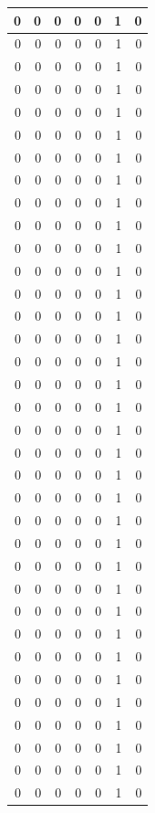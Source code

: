 \documentclass[
  12pt,
]{krantz}
\begin{document}
\begin{tabular}{r|r|r|r|r|r|r}
\hline
0 & 0 & 0 & 0 & 0 & 1 & 0\\
\hline
0 & 0 & 0 & 0 & 0 & 1 & 0\\
\hline
0 & 0 & 0 & 0 & 0 & 1 & 0\\
\hline
0 & 0 & 0 & 0 & 0 & 1 & 0\\
\hline
0 & 0 & 0 & 0 & 0 & 1 & 0\\
\hline
0 & 0 & 0 & 0 & 0 & 1 & 0\\
\hline
0 & 0 & 0 & 0 & 0 & 1 & 0\\
\hline
0 & 0 & 0 & 0 & 0 & 1 & 0\\
\hline
0 & 0 & 0 & 0 & 0 & 1 & 0\\
\hline
0 & 0 & 0 & 0 & 0 & 1 & 0\\
\hline
0 & 0 & 0 & 0 & 0 & 1 & 0\\
\hline
0 & 0 & 0 & 0 & 0 & 1 & 0\\
\hline
0 & 0 & 0 & 0 & 0 & 1 & 0\\
\hline
0 & 0 & 0 & 0 & 0 & 1 & 0\\
\hline
0 & 0 & 0 & 0 & 0 & 1 & 0\\
\hline
0 & 0 & 0 & 0 & 0 & 1 & 0\\
\hline
0 & 0 & 0 & 0 & 0 & 1 & 0\\
\hline
0 & 0 & 0 & 0 & 0 & 1 & 0\\
\hline
0 & 0 & 0 & 0 & 0 & 1 & 0\\
\hline
0 & 0 & 0 & 0 & 0 & 1 & 0\\
\hline
0 & 0 & 0 & 0 & 0 & 1 & 0\\
\hline
0 & 0 & 0 & 0 & 0 & 1 & 0\\
\hline
0 & 0 & 0 & 0 & 0 & 1 & 0\\
\hline
0 & 0 & 0 & 0 & 0 & 1 & 0\\
\hline
0 & 0 & 0 & 0 & 0 & 1 & 0\\
\hline
0 & 0 & 0 & 0 & 0 & 1 & 0\\
\hline
0 & 0 & 0 & 0 & 0 & 1 & 0\\
\hline
0 & 0 & 0 & 0 & 0 & 1 & 0\\
\hline
0 & 0 & 0 & 0 & 0 & 1 & 0\\
\hline
0 & 0 & 0 & 0 & 0 & 1 & 0\\
\hline
0 & 0 & 0 & 0 & 0 & 1 & 0\\
\hline
0 & 0 & 0 & 0 & 0 & 1 & 0\\
\hline
0 & 0 & 0 & 0 & 0 & 1 & 0\\
\hline
0 & 0 & 0 & 0 & 0 & 1 & 0\\
\hline
0 & 0 & 0 & 0 & 0 & 1 & 0\\

\end{tabular}
\end{document}
